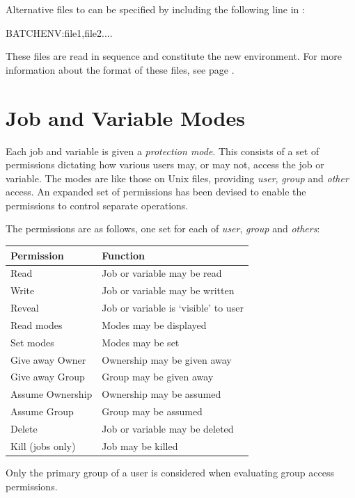 Alternative files to \batchenv{} can be specified by including the following line in \linebreak[20]\masterconfig:

\begin{expara}

BATCHENV:file1,file2....

\end{expara}

These files are read in sequence and constitute the new environment. For more information about the format
of these files, see page \pageref{Staticenv}.

\section{Job and Variable Modes}
Each job and variable is given a \textit{protection mode}. This consists of a set of permissions dictating how various users may, or may not,
access the job or variable. The modes are like those on Unix files, providing \textit{user}, \textit{group} and \textit{other} access. An
expanded set of permissions has been devised to enable the permissions to control separate operations.

The permissions are as follows, one set for each of \textit{user}, \textit{group} and \textit{others}:

\begin{center}
\begin{tabular}{|l l|}
\hline
\bfseries Permission &
\bfseries Function\\\hline
Read & Job or variable may be read\\
Write & Job or variable may be written\\
Reveal & Job or variable is `visible' to user\\
Read modes & Modes may be displayed\\
Set modes & Modes may be set\\
Give away Owner & Ownership may be given away\\
Give away Group & Group may be given away\\
Assume Ownership & Ownership may be assumed\\
Assume Group & Group may be assumed\\
Delete & Job or variable may be deleted\\
Kill (jobs only) & Job may be killed\\\hline
\end{tabular}
\end{center}
Only the primary group of a user is considered when evaluating group access permissions.

